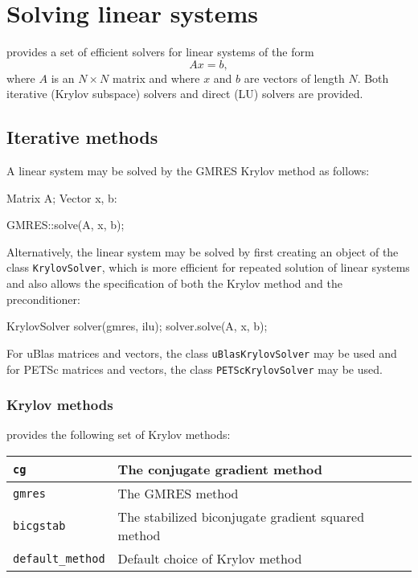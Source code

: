 \section{Solving linear systems}

\dolfin{} provides a set of efficient solvers for linear systems of
the form
\begin{equation}
  Ax = b,
\end{equation}
where $A$ is an $N\times N$ matrix and where $x$ and $b$ are vectors
of length $N$. Both iterative (Krylov subspace) solvers and direct
(LU) solvers are provided.

\subsection{Iterative methods}

A linear system may be solved by the GMRES Krylov method as follows:
\begin{code}
Matrix A;
Vector x, b:

GMRES::solve(A, x, b);
\end{code}
Alternatively, the linear system may be solved by first creating an
object of the class \texttt{KrylovSolver}, which is more efficient for
repeated solution of linear systems and also allows the specification
of both the Krylov method and the preconditioner:
\begin{code}
KrylovSolver solver(gmres, ilu);
solver.solve(A, x, b);
\end{code}

For uBlas matrices and vectors, the class \texttt{uBlasKrylovSolver}
may be used and for PETSc matrices and vectors, the class
\texttt{PETScKrylovSolver} may be used.

\subsubsection{Krylov methods}

\dolfin{} provides the following set of Krylov methods:

\begin{center}
\begin{tabular}{|l|l|}
\hline
\texttt{cg}              & The conjugate gradient method \\
\hline
\texttt{gmres}           & The GMRES method \\
\hline
\texttt{bicgstab}        & The stabilized biconjugate gradient squared
method \\
\hline
\texttt{default\_method} & Default choice of Krylov method \\
\hline
\end{tabular}
\end{center}

